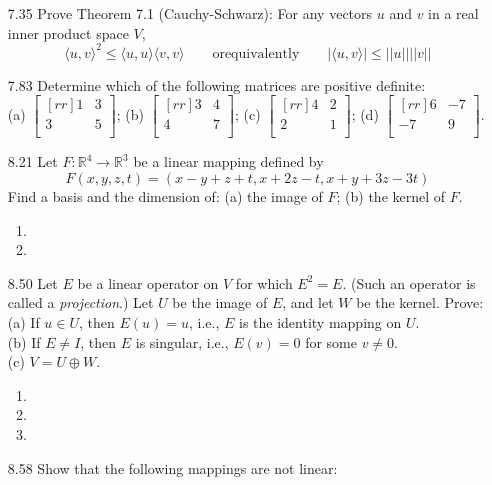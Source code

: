 \documentclass[12pt]{article}
\theoremstyle{plain}
\theoremstyle{definition}
\theoremstyle{plain}
\begin{document}
\begin{enumerate}
\item[7.35]Prove Theorem 7.1 (Cauchy-Schwarz): For any vectors $u$ and $v$ in a real inner product space $V$,
\[ \langle u,v \rangle^2 \leq \langle u,u\rangle \langle v,v\rangle \qquad \mathrm{or equivalently} \qquad |\langle u,v \rangle | \leq ||u|| ||v|| \]

\item[7.83]Determine which of the following matrices are positive definite:\\
(a) $\begin{bmatrix}[rr]1&3\\3&5\\\end{bmatrix}$; (b) $\begin{bmatrix}[rr]3&4\\4&7\\\end{bmatrix}$; (c) $\begin{bmatrix}[rr]4&2\\2&1\\\end{bmatrix}$; (d) $\begin{bmatrix}[rr]6&-7\\-7&9\\\end{bmatrix}$.
\item[8.21]Let $F: \mathbb{R}^4\rightarrow\mathbb{R}^3$ be a linear mapping defined by
\[ F(x,y,z,t)=(x-y+z+t,x+2z-t,x+y+3z-3t) \]
Find a basis and the dimension of: (a) the image of $F$; (b) the kernel of $F$.
	\begin{enumerate}
	\item
	\item
	\end{enumerate}
\item[8.50]Let $E$ be a linear operator on $V$ for which $E^2=E$. (Such an operator is called a \textit{projection}.) Let $U$ be the image of $E$, and let $W$ be the kernel. Prove:\\
(a) If $u\in U$, then $E(u)=u$, i.e., $E$ is the identity mapping on $U$.\\
(b) If $E\neq I$, then $E$ is singular, i.e., $E(v)=0$ for some $v\neq 0$.\\
(c) $V=U\oplus W$.
	\begin{enumerate}
	\item
	\item
	\item
	\end{enumerate}
\item[8.58]Show that the following mappings are not linear:\\

\end{enumerate}
\end{document}
